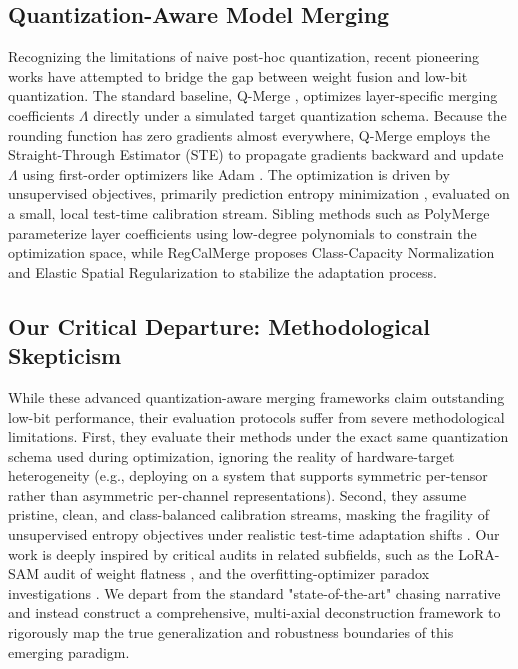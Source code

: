 \subsection{Quantization-Aware Model Merging}
Recognizing the limitations of naive post-hoc quantization, recent pioneering works have attempted to bridge the gap between weight fusion and low-bit quantization. The standard baseline, Q-Merge \cite{qmerge2025}, optimizes layer-specific merging coefficients $\Lambda$ directly under a simulated target quantization schema. Because the rounding function has zero gradients almost everywhere, Q-Merge employs the Straight-Through Estimator (STE) \cite{bengio2013ste, yin2019understanding} to propagate gradients backward and update $\Lambda$ using first-order optimizers like Adam \cite{kingma2014adam}. The optimization is driven by unsupervised objectives, primarily prediction entropy minimization \cite{wang2020tent, zhang2021memo}, evaluated on a small, local test-time calibration stream. Sibling methods such as PolyMerge \cite{polymerge2025} parameterize layer coefficients using low-degree polynomials to constrain the optimization space, while RegCalMerge \cite{regcalmerge2025} proposes Class-Capacity Normalization and Elastic Spatial Regularization to stabilize the adaptation process.

\subsection{Our Critical Departure: Methodological Skepticism}
While these advanced quantization-aware merging frameworks claim outstanding low-bit performance, their evaluation protocols suffer from severe methodological limitations. First, they evaluate their methods under the exact same quantization schema used during optimization, ignoring the reality of hardware-target heterogeneity (e.g., deploying on a system that supports symmetric per-tensor rather than asymmetric per-channel representations). Second, they assume pristine, clean, and class-balanced calibration streams, masking the fragility of unsupervised entropy objectives under realistic test-time adaptation shifts \cite{mummadi2021tta}. Our work is deeply inspired by critical audits in related subfields, such as the LoRA-SAM audit of weight flatness \cite{lorasam2025}, and the overfitting-optimizer paradox investigations \cite{polymerge2025}. We depart from the standard "state-of-the-art" chasing narrative and instead construct a comprehensive, multi-axial deconstruction framework to rigorously map the true generalization and robustness boundaries of this emerging paradigm.
